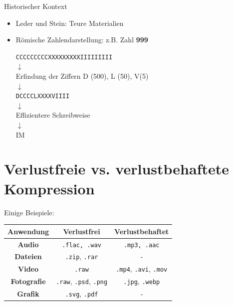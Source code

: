 Historischer Kontext
\begin{itemize}
	\item Leder und Stein: Teure Materialien
	\item Römische Zahlendarstellung: z.B. Zahl \textbf{999}
	      \begin{center}
		      \texttt{CCCCCCCCCXXXXXXXXXIIIIIIIII}\\
		      $\downarrow$\\
		      Erfindung der Ziffern D (500), L (50), V(5)\\
		      $\downarrow$\\
		      \texttt{DCCCCLXXXXVIIII} \\
		      $\downarrow$\\
		      Effizientere Schreibweise\\
		      $\downarrow$\\
		      IM
	      \end{center}
\end{itemize}

\section{Verlustfreie vs. verlustbehaftete Kompression}
Einige Beispiele:
\begin{table}[H]
	\centering
	\begin{tabular}{c||c|c}
		\textbf{Anwendung}  & \textbf{Verlustfrei}                        & \textbf{Verlustbehaftet}                    \\\midrule
		\textbf{Audio}      & \texttt{.flac, .wav}                        & \texttt{.mp3, .aac}                         \\\hline
		\textbf{Dateien}    & \texttt{.zip}, \texttt{.rar}                & \texttt{-}                                  \\\hline
		\textbf{Video}      & \texttt{.raw}                               & \texttt{.mp4}, \texttt{.avi}, \texttt{.mov} \\\hline
		\textbf{Fotografie} & \texttt{.raw}, \texttt{.psd}, \texttt{.png} & \texttt{.jpg}, \texttt{.webp}              \\\hline
		\textbf{Grafik}     & \texttt{.svg}, \texttt{.pdf}                & \texttt{-}
	\end{tabular}
\end{table}


